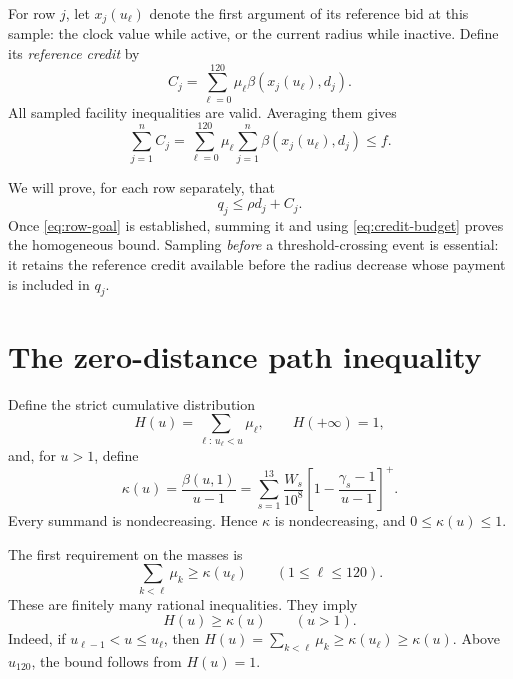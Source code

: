 \documentclass[11pt]{article}
\theoremstyle{definition}
\theoremstyle{remark}
\begin{document}
For row $j$, let $x_j(u_\ell)$ denote the first argument of its reference bid
at this sample: the clock value while active, or the current radius while
inactive. Define its \emph{reference credit} by
\begin{equation}\label{eq:credit}
  C_j=\sum_{\ell=0}^{120}\mu_\ell\beta(x_j(u_\ell),d_j).
\end{equation}
All sampled facility inequalities are valid. Averaging them gives
\begin{equation}\label{eq:credit-budget}
  \sum_{j=1}^n C_j
   =\sum_{\ell=0}^{120}\mu_\ell
       \sum_{j=1}^n\beta(x_j(u_\ell),d_j)
   \le f.
\end{equation}

We will prove, for each row separately, that
\begin{equation}\label{eq:row-goal}
  q_j\le\rho d_j+C_j.
\end{equation}
Once \eqref{eq:row-goal} is established, summing it and using
\eqref{eq:credit-budget} proves the homogeneous bound.
Sampling \emph{before} a threshold-crossing event is essential: it retains
the reference credit available before the radius decrease whose payment is
included in $q_j$.

\section{The zero-distance path inequality}\label{sec:zero}

Define the strict cumulative distribution
\begin{equation}\label{eq:cdf}
  H(u)=\sum_{\ell:\,u_\ell<u}\mu_\ell,
  \qquad H(+\infty)=1,
\end{equation}
and, for $u>1$, define
\begin{equation}\label{eq:kappa}
  \kappa(u)=\frac{\beta(u,1)}{u-1}
   =\sum_{s=1}^{13}\frac{W_s}{10^8}
       \left[1-\frac{\gamma_s-1}{u-1}\right]^+.
\end{equation}
Every summand is nondecreasing. Hence $\kappa$ is nondecreasing,
and $0\le\kappa(u)\le1$.

The first requirement on the masses is
\begin{equation}\label{eq:cdf-checks}
  \sum_{k<\ell}\mu_k\ge\kappa(u_\ell)
  \qquad(1\le\ell\le120).
\end{equation}
These are finitely many rational inequalities. They imply
\begin{equation}\label{eq:cdf-dominance}
  H(u)\ge\kappa(u)\qquad(u>1).
\end{equation}
Indeed, if $u_{\ell-1}<u\le u_\ell$, then
$H(u)=\sum_{k<\ell}\mu_k\ge\kappa(u_\ell)\ge\kappa(u)$.
Above $u_{120}$, the bound follows from $H(u)=1$.
\end{document}
